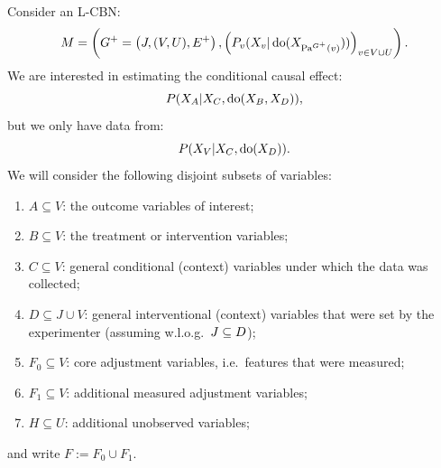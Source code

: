 \begin{Not}
Consider an L-CBN:
        \[M= \left ( G^+=\left ( J,(V,U),E^+ \right ), \left ( P_v ( X_v|\operatorname{do}( X_{\mathrm{Pa}^{G^+}(v)})) \right )_{v \in V \cup U} \right ).\]
We are interested in estimating the conditional causal effect:
\[ P(X_A|X_C,\operatorname{do}(X_B,X_D)), \]
but we only have data from:
\[ P(X_V|X_C,\operatorname{do}(X_D)). \]
We will consider the following disjoint subsets of variables:
\begin{enumerate}
    \item $A \subseteq V$: the outcome variables of interest;
    \item $B \subseteq V$: the treatment or intervention variables;
    \item $C \subseteq V$: general conditional (context) variables under which the data was collected;
    \item $D \subseteq J \cup V$: general interventional (context) variables that were set by the experimenter (assuming w.l.o.g.\ $J \subseteq D$);
    \item $F_0 \subseteq V$: core adjustment variables, i.e.\ features that were measured;
    \item $F_1 \subseteq V$: additional measured adjustment variables;
    \item $H \subseteq U$: additional unobserved variables;
\end{enumerate}
and write $F := F_0 \cup F_1$.
\end{Not}


